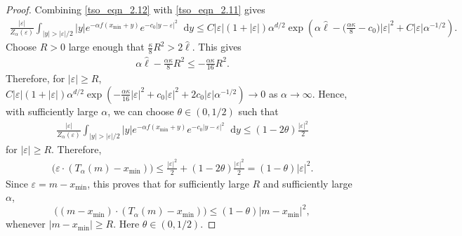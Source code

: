 \documentclass{article}
\newcommand*\der{\mathop{}\!\mathrm{d}}
\numberwithin{equation}{section}
\begin{document}
\begin{proof}
Combining \eqref{tso_eqn_2.12} with \eqref{tso_eqn_2.11} gives
\begin{align*} 
\frac{|\varepsilon|}{Z_\alpha(\varepsilon)}  \int_{|y| > |\varepsilon| /2} |y| e^{-\alpha f(x_{\min} + y)} e^{-c_0|y - \varepsilon|^2} \der y \leq C|\varepsilon|(1 + |\varepsilon|) \alpha^{d/2} \exp\left(\alpha \hat \ell - \big(\frac{\alpha \kappa}{8} - c_0\big)|\varepsilon|^2 + C|\varepsilon|\alpha^{-1/2}\right).
\end{align*}
Choose $R > 0$ large enough that $\frac{\kappa}{8}R^2 > 2\hat{\ell}$. This gives 
\begin{align*} 
\alpha \hat{\ell} - \frac{\alpha \kappa}{8}R^2 \leq -\frac{\alpha \kappa}{16}R^2. 
\end{align*}
Therefore, for $|\varepsilon| \geq R$, $C |\varepsilon|(1+|\varepsilon|)\alpha^{d/2} \exp\left(-\frac{\alpha \kappa}{16}|\varepsilon|^2 + c_0|\varepsilon|^2 + 2 c_0 |\varepsilon|\alpha^{-1/2}\right) \to 0 $
as $\alpha \to \infty$. Hence, with sufficiently large $\alpha$, we can choose $\theta \in (0, 1/2)$ such that 
\begin{align*} 
\frac{|\varepsilon|}{Z_\alpha(\varepsilon)} \int_{|y| > |\varepsilon| /2} |y| e^{-\alpha f(x_{\min} + y)} e^{-c_0|y - \varepsilon|^2} \der y \leq (1-2\theta)\frac{|\varepsilon|^2}{2}
\end{align*}
for $|\varepsilon| \geq R$. Therefore,
\begin{align*}
\big(\varepsilon \cdot (T_\alpha(m) - x_{\min}) \big)\leq \frac{|\varepsilon|^2}{2} + (1 -2 \theta)\frac{|\varepsilon|^2}{2} = (1 -\theta)|\varepsilon|^2.
\end{align*}
Since $\varepsilon = m - x_{\min}$, this proves that for sufficiently large $R$ and sufficiently large $\alpha$,
\begin{equation} \label{tso_eqn_2.17}
\big( (m - x_{\min} ) \cdot (T_\alpha(m) - x_{\min})\big) \leq (1-\theta)|m - x_{\min}|^2,
\end{equation}
whenever $ |m - x_{\min}| \geq R$. Here $\theta \in (0, 1/2)$. 


\end{proof}
\end{document}
